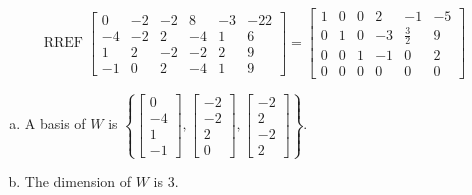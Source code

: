 \begin{exerciseAnswer} 


\[\operatorname{RREF} \left[\begin{array}{cccccc}
0 & -2 & -2 & 8 & -3 & -22 \\
-4 & -2 & 2 & -4 & 1 & 6 \\
1 & 2 & -2 & -2 & 2 & 9 \\
-1 & 0 & 2 & -4 & 1 & 9
\end{array}\right] = \left[\begin{array}{cccccc}
1 & 0 & 0 & 2 & -1 & -5 \\
0 & 1 & 0 & -3 & \frac{3}{2} & 9 \\
0 & 0 & 1 & -1 & 0 & 2 \\
0 & 0 & 0 & 0 & 0 & 0
\end{array}\right] \]


\begin{enumerate}[(a)]
\item A basis of \(W\) is \( \left\{ \left[\begin{array}{c}
0 \\
-4 \\
1 \\
-1
\end{array}\right] , \left[\begin{array}{c}
-2 \\
-2 \\
2 \\
0
\end{array}\right] , \left[\begin{array}{c}
-2 \\
2 \\
-2 \\
2
\end{array}\right] \right\} \).
\item The dimension of \(W\) is \( 3 \).
\end{enumerate}
    
\end{exerciseAnswer}
    
